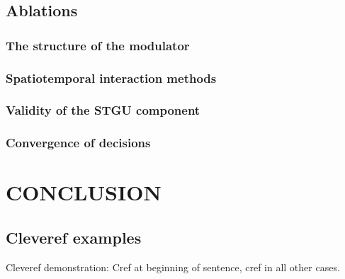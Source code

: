 \documentclass[conference,a4paper,english]{IEEEtran}[2015/08/26]
\begin{document}
  

\subsection{ Ablations}

\subsubsection{The structure of the modulator}

\begin{table}[ht]
  \centering
  \caption{Comparison of Different Models}
  \end{table}
  
  \subsubsection{Spatiotemporal interaction methods}
  \subsubsection{Validity of the STGU component}
  \subsubsection{Convergence of decisions}






\section{CONCLUSION}

\newpage
\newpage
\subsection{Cleveref examples}
\label{sec:ex:cref}

Cleveref demonstration: Cref at beginning of sentence, cref in all other cases.
\end{document}
